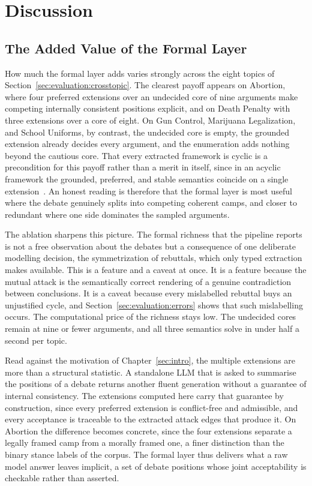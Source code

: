 %
\chapter{Discussion}
\label{sec:discussion}

\section{The Added Value of the Formal Layer}
\label{sec:discussion:value}

How much the formal layer adds varies strongly across the eight topics of
Section~\ref{sec:evaluation:crosstopic}. The clearest payoff appears on
Abortion, where four preferred extensions over an undecided core of nine
arguments make competing internally consistent positions explicit, and on
Death Penalty with three extensions over a core of eight. On Gun Control,
Marijuana Legalization, and School Uniforms, by contrast, the undecided core
is empty, the grounded extension already decides every argument, and the
enumeration adds nothing beyond the cautious core. That every extracted
framework is cyclic is a precondition for this payoff rather than a merit in
itself, since in an acyclic framework the grounded, preferred, and stable
semantics coincide on a single extension~\cite{dung1995}. An honest reading is
therefore that the formal layer is most useful where the debate genuinely
splits into competing coherent camps, and closer to redundant where one side
dominates the sampled arguments.

The ablation sharpens this picture. The formal richness that the pipeline
reports is not a free observation about the debates but a consequence of one
deliberate modelling decision, the symmetrization of rebuttals, which only
typed extraction makes available. This is a feature and a caveat at once. It is a feature
because the mutual attack is the semantically correct rendering of a genuine
contradiction between conclusions. It is a caveat because every mislabelled
rebuttal buys an unjustified cycle, and Section~\ref{sec:evaluation:errors}
shows that such mislabelling occurs. The computational price of the richness
stays low. The undecided cores remain at nine or fewer arguments, and all three
semantics solve in under half a second per topic.

Read against the motivation of Chapter~\ref{sec:intro}, the multiple
extensions are more than a structural statistic. A standalone LLM that is
asked to summarise the positions of a debate returns another fluent generation
without a guarantee of internal consistency. The extensions computed here
carry that guarantee by construction, since every preferred extension is
conflict-free and admissible, and every acceptance is traceable to the
extracted attack edges that produce it. On Abortion the difference becomes
concrete, since the four extensions separate a legally framed camp from a
morally framed one, a finer distinction than the binary stance labels of the
corpus. The formal layer thus delivers what a raw model answer leaves
implicit, a set of debate positions whose joint acceptability is checkable
rather than asserted.

